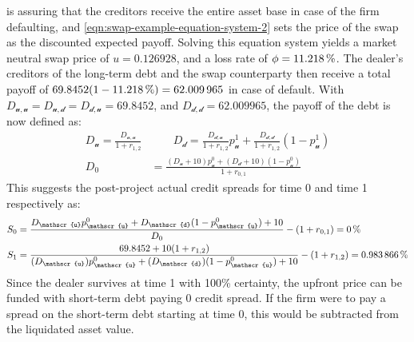 \documentclass[main.tex]{subfiles}
\begin{document}
             is assuring that the creditors receive the entire asset base in case of the firm defaulting,
            and \cref{eqn:swap-example-equation-system-2} sets the price of the swap as the discounted expected payoff.
            Solving this equation system yields a market neutral swap price of $u=\num{0.126928}$,
            and a loss rate of $\phi=\pct{0.11218}$.
            The dealer's creditors of the long-term debt and the swap counterparty then receive a total payoff of $69.8452(1-\pct{0.11218})=\num{62.009965}$ in case of default.
            With $D_{\mathscr{u},\mathscr{u}}=D_{\mathscr{u},\mathscr{d}}=D_{\mathscr{d},\mathscr{u}}=\num{69.8452}$,
            and $D_{\mathscr{d},\mathscr{d}}=\num{62.009965}$,
            the payoff of the debt is now defined as:
            \begin{align}
                D_{\mathscr{u}} =
                \frac{D_{\mathscr{u},\mathscr{u}}}{1+r_{1,2}}
                &\qquad
                D_{\mathscr{d}} =
                \frac{D_{\mathscr{d},\mathscr{u}}}{1+r_{1,2}}p_{\mathscr{u}}^{1}+
                \frac{D_{\mathscr{d},\mathscr{d}}}{1+r_{1,2}}(1-p_{\mathscr{u}}^{1})
                \nonumber
                \\
                D_0 &= \frac{(D_{\mathscr{u}}+10)p_{\mathscr{u}}^{0}+(D_{\mathscr{d}}+10)(1-p_{\mathscr{u}}^{0})}{1+r_{0,1}}
                \nonumber
            \end{align}
            This suggests the post-project actual credit spreads for time 0 and time 1 respectively as:
            \begin{align}
                S_0 &= \frac{
                    D_{\mathscr{u}}p_{\mathscr{u}}^{0}+D_{\mathscr{d}}(1-p_{\mathscr{u}}^{0})+\num{10}
                }{
                    D_{0}
                }
                -
                (1+r_{0,1})
                = \pct{0}
                \\
                S_1 &= \frac{
                    \num{69.8452}+\num{10}(1+r_{1,2})
                }{
                    (D_{\mathscr{u}})p_{\mathscr{u}}^{0}
                    +
                    (D_{\mathscr{d}})(1-p_{\mathscr{u}}^{0})
                    +
                    10
                }
                -
                (1+r_{1,2})
                = \pct{0.00983866}
            \end{align}
            Since the dealer survives at time 1 with 100\% certainty,
            the upfront price can be funded with short-term debt paying 0 credit spread.
            If the firm were to pay a spread on the short-term debt starting at time 0,
            this would be subtracted from the liquidated asset value. 
\end{document}
